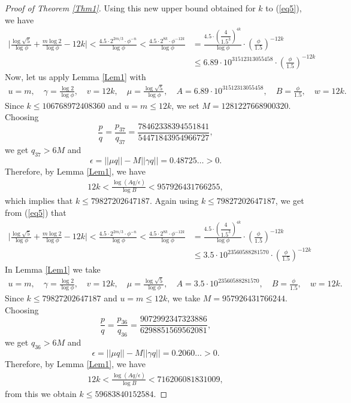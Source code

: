 \documentclass[10pt,a4paper]{amsart}
\begin{document}
\begin{proof}[Proof of Theorem \ref{Thm1}]
Using this new upper bound obtained for $k$ to (\ref{eq5}), we have
\begin{align*}
\bigg|\frac{\log\sqrt{5}}{\log\phi}+\frac{m\log2}{\log\phi}-12k\bigg|<\frac{4.5\cdot 2^{2m/3}\cdot\phi^{-n}}{\log\phi}<\frac{4.5\cdot 2^{8k}\cdot\phi^{-{12k}}}{\log\phi}&=\frac{4.5\cdot (\dfrac{4}{1.5^3})^{4k}}{\log\phi}\cdot (\frac{\phi}{1.5})^{-12k}\\
&\leq 6.89\cdot 10^{31512313055458}\cdot (\frac{\phi}{1.5})^{-12k} 
\end{align*}
Now, let us apply Lemma \ref{Lem1} with
\begin{align*}
    u=m,\quad \gamma=\frac{\log2}{\log \phi},\quad v=12k,\quad \mu=\frac{\log\sqrt{5}}{\log \phi},\quad A=6.89\cdot 10^{31512313055458},\quad B=\frac{\phi}{1.5},\quad w=12k.
\end{align*}
Since $k\leq  106768972408360$ and $u=m\leq 12k$, we set $M=1281227668900320$. Choosing  
$$\frac{p}{q}=\frac{p_{37}}{q_{37}}=\frac{78462338394551841}{54471843954966727},$$
we get $q_{37}>6M$ and
$$\epsilon=||\mu q||-M||\gamma q||=0.48725\ldots>0.$$
Therefore, by Lemma \ref{Lem1}, we have
\begin{align*}
    12k<\frac{\log(Aq/\epsilon)}{\log B}<957926431766255,
\end{align*}
which implies that $k\leq 79827202647187$. Again using $k\leq 79827202647187$, we get from (\ref{eq5}) that 
\begin{align*}
\bigg|\frac{\log\sqrt{5}}{\log\phi}+\frac{m\log2}{\log\phi}-12k\bigg|<\frac{4.5\cdot 2^{2m/3}\cdot\phi^{-n}}{\log\phi}<\frac{4.5\cdot 2^{8k}\cdot\phi^{-{12k}}}{\log\phi}&=\frac{4.5\cdot (\dfrac{4}{1.5^3})^{4k}}{\log\phi}\cdot (\frac{\phi}{1.5})^{-12k}\\
&\leq 3.5\cdot 10^{23560588281570}\cdot (\frac{\phi}{1.5})^{-12k} 
\end{align*}
In Lemma \ref{Lem1} we take
\begin{align*}
    u=m,\quad \gamma=\frac{\log2}{\log \phi},\quad v=12k,\quad \mu=\frac{\log\sqrt{5}}{\log \phi},\quad A=3.5\cdot 10^{23560588281570},\quad B=\frac{\phi}{1.5},\quad w=12k.
\end{align*}
Since $k\leq  79827202647187$ and $u=m\leq 12k$, we take $M=957926431766244$. Choosing  
$$\frac{p}{q}=\frac{p_{36}}{q_{36}}=\frac{9072992347323886}{6298851569562081},$$
we get $q_{36}>6M$ and
$$\epsilon=||\mu q||-M||\gamma q||=0.2060\ldots>0.$$
Therefore, by Lemma \ref{Lem1}, we have
\begin{align*}
    12k<\frac{\log(Aq/\epsilon)}{\log B}<716206081831009,
\end{align*}
from this we obtain $k\leq 59683840152584$. 



\end{proof}
\end{document}

